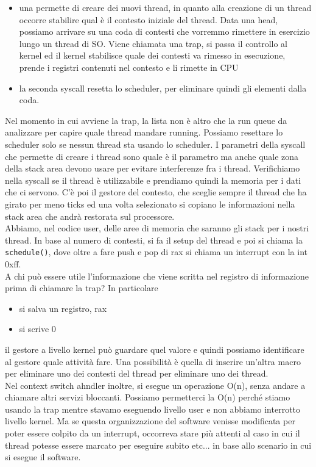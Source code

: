 \documentclass[12pt, oneside]{extbook}
\begin{document}
\begin{itemize}
\item una permette di creare dei nuovi thread, in quanto alla creazione di un thread occorre stabilire qual è il contesto iniziale del thread. Data una head, possiamo arrivare su una coda di contesti che vorremmo rimettere in esercizio lungo un thread di SO. Viene chiamata una trap, si passa il controllo al kernel ed il kernel stabilisce quale dei contesti va rimesso in esecuzione, prende i registri contenuti nel contesto e li rimette in CPU
\item la seconda syscall resetta lo scheduler, per eliminare quindi gli elementi dalla coda.
\end{itemize}
Nel momento in cui avviene la trap, la lista non è altro che la run queue da analizzare per capire quale thread mandare running. Possiamo resettare lo scheduler solo se nessun thread sta usando lo scheduler. I parametri della syscall che permette di creare i thread sono quale è il parametro ma anche quale zona della stack area devono usare per evitare interferenze fra i thread. Verifichiamo nella syscall se il thread è utilizzabile e prendiamo quindi la memoria per i dati che ci servono. C'è poi il gestore del contesto, che sceglie sempre il thread che ha girato per meno ticks ed una volta selezionato si copiano le informazioni nella stack area che andrà restorata sul processore.\\Abbiamo, nel codice user, delle aree di memoria che saranno gli stack per i nostri thread. In base al numero di contesti, si fa il setup del thread e poi si chiama la \texttt{schedule()}, dove oltre a fare push e pop di rax si chiama un interrupt con la int 0xff.\\A chi può essere utile l'informazione che viene scritta nel registro di informazione prima di chiamare la trap? In particolare
\begin{itemize}
\item si salva un registro, rax
\item si scrive 0
\end{itemize}
il gestore a livello kernel può guardare quel valore e quindi possiamo identificare al gestore quale attività fare. Una possibilità è quella di inserire un'altra macro per eliminare uno dei contesti del thread per eliminare uno dei thread.\\Nel context switch ahndler inoltre, si esegue un operazione O(n), senza andare a chiamare altri servizi bloccanti. Possiamo permetterci la O(n) perché stiamo usando la trap mentre stavamo eseguendo livello user e non abbiamo interrotto livello kernel. Ma se questa organizzazione del software venisse modificata per poter essere colpito da un interrupt, occorreva stare più attenti al caso in cui il thread potesse essere marcato per eseguire subito etc... in base allo scenario in cui si esegue il software.
\end{document}
